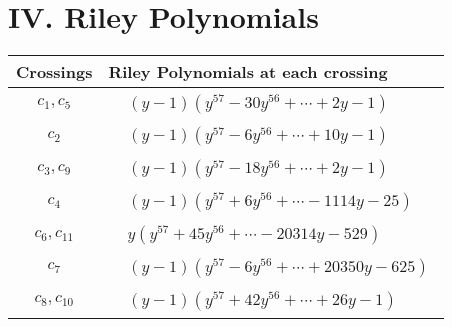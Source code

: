 \documentclass[1p]{elsarticle_modified}
\theoremstyle{definition}
\begin{document}
\centering \section*{ IV. Riley Polynomials}
\begin{tabular}{m{50pt}|m{274pt}}
Crossings & \hspace{64pt}Riley Polynomials at each crossing \\
\hline $$\begin{aligned}c_{1},c_{5}\end{aligned}$$&$\begin{aligned}
&(y-1)(y^{57}-30 y^{56}+\cdots+2 y-1)
\end{aligned}$\\
\hline $$\begin{aligned}c_{2}\end{aligned}$$&$\begin{aligned}
&(y-1)(y^{57}-6 y^{56}+\cdots+10 y-1)
\end{aligned}$\\
\hline $$\begin{aligned}c_{3},c_{9}\end{aligned}$$&$\begin{aligned}
&(y-1)(y^{57}-18 y^{56}+\cdots+2 y-1)
\end{aligned}$\\
\hline $$\begin{aligned}c_{4}\end{aligned}$$&$\begin{aligned}
&(y-1)(y^{57}+6 y^{56}+\cdots-1114 y-25)
\end{aligned}$\\
\hline $$\begin{aligned}c_{6},c_{11}\end{aligned}$$&$\begin{aligned}
&y(y^{57}+45 y^{56}+\cdots-20314 y-529)
\end{aligned}$\\
\hline $$\begin{aligned}c_{7}\end{aligned}$$&$\begin{aligned}
&(y-1)(y^{57}-6 y^{56}+\cdots+20350 y-625)
\end{aligned}$\\
\hline $$\begin{aligned}c_{8},c_{10}\end{aligned}$$&$\begin{aligned}
&(y-1)(y^{57}+42 y^{56}+\cdots+26 y-1)
\end{aligned}$\\
\hline
\end{tabular}
\vskip 2pc
\end{document}
